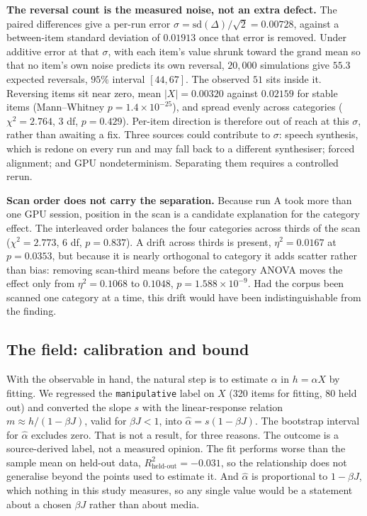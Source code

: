\documentclass[preprint,12pt]{elsarticle}
\begin{document}
\textbf{The reversal count is the measured noise, not an extra defect.} The paired differences
give a per-run error $\sigma = \mathrm{sd}(\Delta)/\sqrt{2} = 0.00728$, against a
between-item standard deviation of $0.01913$ once that error is removed. Under additive error
at that $\sigma$, with each item's value shrunk toward the grand mean so that no item's own
noise predicts its own reversal, $20{,}000$ simulations give $55.3$ expected reversals, $95\%$
interval $[44, 67]$. The observed $51$ sits inside it. Reversing items sit near zero, mean
$|X| = 0.00320$ against $0.02159$ for stable items (Mann--Whitney $p = 1.4\times10^{-25}$),
and spread evenly across categories ($\chi^2 = 2.764$, 3 df, $p = 0.429$). Per-item
direction is therefore out of reach at this $\sigma$, rather than awaiting a fix. Three
sources could contribute to $\sigma$: speech synthesis, which is redone on every run and may
fall back to a different synthesiser; forced alignment; and GPU nondeterminism. Separating
them requires a controlled rerun.

\textbf{Scan order does not carry the separation.} Because run A took more than one GPU
session, position in the scan is a candidate explanation for the category effect. The
interleaved order balances the four categories across thirds of the scan
($\chi^2 = 2.773$, 6 df, $p = 0.837$). A drift across thirds is present, $\eta^2 = 0.0167$
at $p = 0.0353$, but because it is nearly orthogonal to category it adds scatter rather than
bias: removing scan-third means before the category ANOVA moves the effect only from
$\eta^2 = 0.1068$ to $0.1048$, $p = 1.588\times10^{-9}$. Had the corpus been scanned one
category at a time, this drift would have been indistinguishable from the finding.

\subsection{The field: calibration and bound}
\label{sec:physics}

With the observable in hand, the natural step is to estimate $\alpha$ in $h = \alpha X$ by
fitting. We regressed the \texttt{manipulative} label on $X$ (320 items for fitting, 80 held
out) and converted the slope $s$ with the linear-response relation
$m \approx h/(1 - \beta J)$, valid for $\beta J < 1$, into $\hat\alpha = s(1-\beta J)$. The
bootstrap interval for $\hat\alpha$ excludes zero. That is not a result, for three reasons.
The outcome is a source-derived label, not a measured opinion. The fit performs worse than the
sample mean on held-out data, $R^2_{\text{held-out}} = -0.031$, so the relationship does not
generalise beyond the points used to estimate it. And $\hat\alpha$ is proportional to
$1-\beta J$, which nothing in this study measures, so any single value would be a statement
about a chosen $\beta J$ rather than about media.
\end{document}
